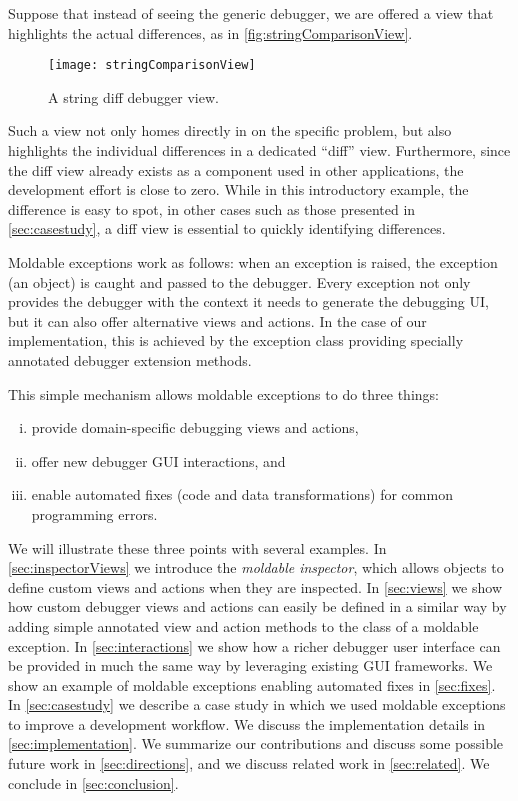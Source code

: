 \documentclass[sigplan,anonymous,review,10pt]{acmart}
\begin{document}
Suppose that instead of seeing the generic debugger, we are offered a view that highlights the actual differences, as in \autoref{fig:stringComparisonView}.
\begin{figure}[h]
  \texttt{[image: stringComparisonView]}
  \caption{A string diff debugger view.}
  \label{fig:stringComparisonView}
\end{figure}
Such a view not only homes directly in on the specific problem, but also highlights the individual differences in a dedicated ``diff'' view.
Furthermore, since the diff view already exists as a component used in other applications, the development effort is close to zero.
While in this introductory example, the difference is easy to spot, in other cases such as those presented in \autoref{sec:casestudy}, a diff view is essential to quickly identifying differences.

Moldable exceptions work as follows: when an exception is raised, the exception (an object) is caught and passed to the debugger.
Every exception not only provides the debugger with the context it needs to generate the debugging UI, but it can also offer alternative views and actions.
In the case of our implementation, this is achieved by the exception class providing specially annotated debugger extension methods.

This simple mechanism allows moldable exceptions to do three things:
\begin{enumerate}[(i)]
	\item provide domain-specific debugging views and actions,
	\item offer new debugger GUI interactions, and
	\item enable automated fixes (code and data transformations) for common programming errors.
\end{enumerate}

We will illustrate these three points with several examples.
In \autoref{sec:inspectorViews} we introduce the \emph{moldable inspector}, which allows objects to define custom views and actions when they are inspected.
In \autoref{sec:views} we show how custom debugger views and actions can easily be defined in a similar way by adding simple annotated view and action methods to the class of a moldable exception.
In \autoref{sec:interactions} we show how a richer debugger user interface can be provided in much the same way by leveraging existing GUI frameworks.
We show an example of moldable exceptions enabling automated fixes in \autoref{sec:fixes}.
In \autoref{sec:casestudy} we describe a case study in which we used moldable exceptions to improve a development workflow.
We discuss the implementation details in \autoref{sec:implementation}.
We summarize our contributions and discuss some possible future work in \autoref{sec:directions}, and we discuss related work in \autoref{sec:related}.
We conclude in \autoref{sec:conclusion}.
\end{document}
